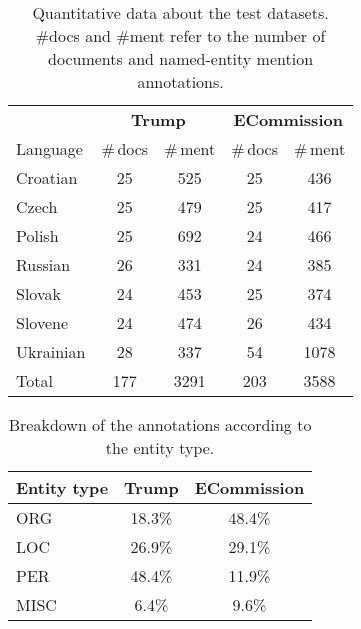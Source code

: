 \documentclass[11pt]{article}
\begin{document}
\begin{table}
\begin{center}
\begin{footnotesize}
\begin{tabular}{lcccc}
\toprule 
 & \multicolumn{2}{c}{\textbf{{\sc Trump}}} & \multicolumn{2}{c}{\textbf{{\sc ECommission}}} \\
\cmidrule(lr){2-3}
\cmidrule(lr){4-5}
Language &  \#\,docs & \#\,ment & \#\,docs & \#\,ment \\
\midrule
Croatian & 25 & 525 & 25 & 436 \\
Czech & 25 & 479  & 25 & 417 \\
Polish & 25 & 692  & 24 & 466 \\
Russian & 26 & 331  & 24 & 385 \\
Slovak  & 24 & 453  & 25 & 374 \\
Slovene & 24 & 474  & 26 & 434 \\
Ukrainian & 28 & 337  & 54 & 1078 \\
\midrule
Total & 177 & 3291  & 203 & 3588 \\


\bottomrule
\end{tabular}
\end{footnotesize}
\end{center}
\caption{Quantitative data about the test datasets. \#docs and \#ment refer to the number of documents and named-entity mention annotations.}
\label{tab:datasets}
\end{table}

\begin{table}
\begin{center}
\begin{footnotesize}
\begin{tabular}{lcc}
\toprule 
 Entity type & {\textbf{{\sc Trump}}} & {\textbf{{\sc ECommission}}} \\
\midrule
ORG & 18.3\% & 48.4\% \\
LOC & 26.9\% & 29.1\% \\
PER & 48.4\% & 11.9\% \\
MISC & 6.4\% & 9.6\% \\
\bottomrule
\end{tabular}
\end{footnotesize}
\end{center}
\caption{Breakdown of the annotations according to the entity type.}
\label{tab:datasets-2}
\end{table}
\end{document}
